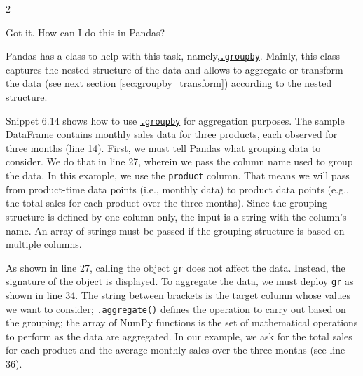 \documentclass[a4paper,11pt]{book}
\newcommand{\question}[1]{%
    \begin{tcolorbox}[colback=comp_c!10,colframe=comp_c,sidebyside align=top,width=\linewidth,before skip=1ex]
        #1
    \end{tcolorbox}
    \switchcolumn%
}
\newcommand{\note}[1]{%
    \begin{tcolorbox}[colback=white!0,colframe=white!10,width=\linewidth,before skip=1ex]
        #1
    \end{tcolorbox}
}
\begin{document}
\begin{paracol}{2}
	\question{\raggedright Got it. How can I do this in Pandas?}
	\note{Pandas has a class to help with this task, namely,\href{https://pandas.pydata.org/docs/reference/api/pandas.DataFrame.groupby.html\#pandas.DataFrame.groupby}{\texttt{.groupby}}. Mainly, this class captures the nested structure of the data and allows to aggregate or transform the data (see next section \ref{sec:groupby_transform}) according to the nested structure.
	
	\quad Snippet 6.14 shows how to use \href{https://pandas.pydata.org/docs/reference/api/pandas.DataFrame.groupby.html\#pandas.DataFrame.groupby}{\texttt{.groupby}} for aggregation purposes. The sample DataFrame contains monthly sales data for three products, each observed for three months (line 14). First, we must tell Pandas what grouping data to consider. We do that in line 27, wherein we pass the column name used to group the data. In this example, we use the \texttt{product} column. That means we will pass from product-time data points (i.e., monthly data) to product data points (e.g., the total sales for each product over the three months). Since the grouping structure is defined by one column only, the input is a string with the column's name. An array of strings must be passed if the grouping structure is based on multiple columns.
	
	\quad As shown in line 27, calling the object \texttt{gr} does not affect the data. Instead, the signature of the object is displayed. To aggregate the data, we must deploy \texttt{gr} as shown in line 34. The string between brackets is the target column whose values we want to consider; \href{https://pandas.pydata.org/docs/reference/api/pandas.core.groupby.DataFrameGroupBy.aggregate.html?highlight=aggregate\#pandas.core.groupby.DataFrameGroupBy.aggregate}{\texttt{.aggregate()}} defines the operation to carry out based on the grouping; the array of NumPy functions is the set of mathematical operations to perform as the data are aggregated. In our example, we ask for the total sales for each product and the average monthly sales over the three months (see line 36).
	}
\end{paracol}
\end{document}
